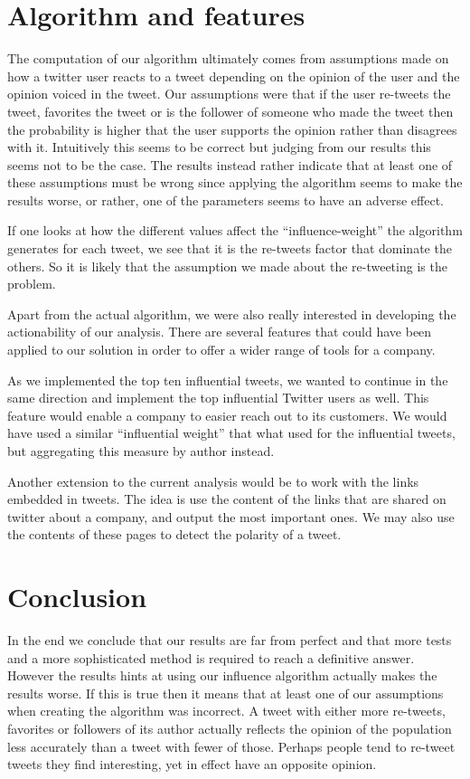 \documentclass[a4paper,12pt]{report}
\begin{document}
\section{Algorithm and features}

The computation of our algorithm ultimately comes from assumptions made on how a twitter user reacts to a tweet depending on the opinion of the user and the opinion voiced in the tweet. Our assumptions were that if the user re-tweets the tweet, favorites the tweet or is the follower of someone who made the tweet then the probability is higher that the user supports the opinion rather than disagrees with it. Intuitively this seems to be correct but judging from our results this seems not to be the case. The results instead rather indicate that at least one of these assumptions must be wrong since applying the algorithm seems to make the results worse, or rather, one of the parameters seems to have an adverse effect. 

If one looks at how the different values affect the ``influence-weight'' the algorithm generates for each tweet, we see that it is the re-tweets factor that dominate the others. So it is likely that the assumption we made about the re-tweeting is the problem.

Apart from the actual algorithm, we were also really interested in developing the actionability of our analysis. There are several features that could have been applied to our solution in order to offer a wider range of tools for a company.

As we implemented the top ten influential tweets, we wanted to continue in the same direction and implement the top influential Twitter users as well. This feature would enable a company to easier reach out to its customers. We would have used a similar “influential weight” that what used for the influential tweets, but aggregating this measure by author instead.

Another extension to the current analysis would be to work with the links embedded in tweets. The idea is use the content of the links that are shared on twitter about a company, and output the most important ones. We may also use the contents of these pages to detect the polarity of a tweet.

\section{Conclusion}

In the end we conclude that our results are far from perfect and that more tests and a more sophisticated method is required to reach a definitive answer. However the results hints at using our influence algorithm actually makes the results worse. If this is true then it means that at least one of our assumptions when creating the algorithm was incorrect. A tweet with either more re-tweets, favorites or followers of its author actually reflects the opinion of the population less accurately than a tweet with fewer of those. Perhaps people tend to re-tweet tweets they find interesting, yet in effect have an opposite opinion.
\end{document}
